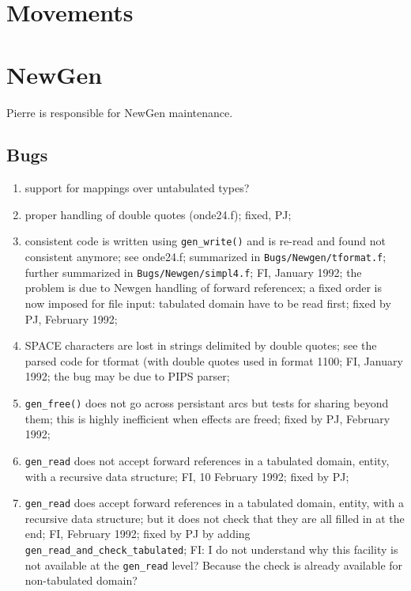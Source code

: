 \section{Movements}

\section{NewGen}

Pierre is responsible for NewGen maintenance.

\subsection{Bugs}

\begin{enumerate}

  \item support for mappings over untabulated types?

  \item proper handling of double quotes (onde24.f); fixed, PJ;

  \item consistent code is written using \verb+gen_write()+ and is re-read
        and found not consistent anymore; see onde24.f; summarized
        in \verb+Bugs/Newgen/tformat.f+; further summarized in
        \verb+Bugs/Newgen/simpl4.f+; FI, January 1992; the problem
        is due to Newgen handling of forward referencex; a fixed order
        is now imposed for file input: tabulated domain have to be
        read first; fixed by PJ, February 1992;

  \item SPACE characters are lost in strings delimited by double quotes;
        see the parsed code for tformat (with double quotes used in
        format 1100; FI, January 1992; the bug may be due to PIPS parser;

  \item \verb+gen_free()+ does not go across persistant arcs but tests for
        sharing beyond them; this is highly inefficient when effects
        are freed; fixed by PJ, February 1992;

  \item \verb+gen_read+ does not accept forward references in a tabulated
        domain, entity, with a recursive data structure; FI, 10 February 1992;
        fixed by PJ;

  \item \verb+gen_read+ does accept forward references in a tabulated
        domain, entity, with a recursive data structure; but it does
        not check that they are all filled in at the end; FI, February 1992;
        fixed by PJ by adding \verb+gen_read_and_check_tabulated+; FI:
        I do not understand why this facility is not available at the
        \verb+gen_read+ level? Because the check is already available for
        non-tabulated domain?


\end{enumerate}
